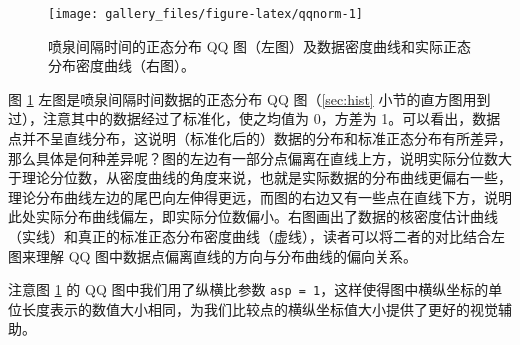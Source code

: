 \documentclass[
  b5paper,
  UTF8,twoside]{book}
\newenvironment{Shaded}{\begin{snugshade}}{\end{snugshade}}
\newcommand{\AttributeTok}[1]{\textcolor[rgb]{0.13,0.29,0.53}{#1}}
\newcommand{\ConstantTok}[1]{\textcolor[rgb]{0.56,0.35,0.01}{#1}}
\newcommand{\DecValTok}[1]{\textcolor[rgb]{0.00,0.00,0.81}{#1}}
\newcommand{\FloatTok}[1]{\textcolor[rgb]{0.00,0.00,0.81}{#1}}
\newcommand{\FunctionTok}[1]{\textcolor[rgb]{0.13,0.29,0.53}{\textbf{#1}}}
\newcommand{\NormalTok}[1]{#1}
\newcommand{\OtherTok}[1]{\textcolor[rgb]{0.56,0.35,0.01}{#1}}
\newcommand{\SpecialCharTok}[1]{\textcolor[rgb]{0.81,0.36,0.00}{\textbf{#1}}}
\newcommand{\StringTok}[1]{\textcolor[rgb]{0.31,0.60,0.02}{#1}}
\begin{document}
\begin{Shaded}
\end{Shaded}

\begin{figure}

{\centering \texttt{[image: gallery\_files/figure-latex/qqnorm-1]} 

}

\caption[喷泉间隔时间的正态分布 QQ 图]{喷泉间隔时间的正态分布 QQ 图（左图）及数据密度曲线和实际正态分布密度曲线（右图）。}\label{fig:qqnorm}
\end{figure}

图 \ref{fig:qqnorm} 左图是喷泉间隔时间数据的正态分布 QQ 图（\ref{sec:hist} 小节的直方图用到过），注意其中的数据经过了标准化，使之均值为 0，方差为 1。可以看出，数据点并不呈直线分布，这说明（标准化后的）数据的分布和标准正态分布有所差异，那么具体是何种差异呢？图的左边有一部分点偏离在直线上方，说明实际分位数大于理论分位数，从密度曲线的角度来说，也就是实际数据的分布曲线更偏右一些，理论分布曲线左边的尾巴向左伸得更远，而图的右边又有一些点在直线下方，说明此处实际分布曲线偏左，即实际分位数偏小。右图画出了数据的核密度估计曲线（实线）和真正的标准正态分布密度曲线（虚线），读者可以将二者的对比结合左图来理解 QQ 图中数据点偏离直线的方向与分布曲线的偏向关系。

注意图 \ref{fig:qqnorm} 的 QQ 图中我们用了纵横比参数 \texttt{asp\ =\ 1}，这样使得图中横纵坐标的单位长度表示的数值大小相同，为我们比较点的横纵坐标值大小提供了更好的视觉辅助。
\end{document}
